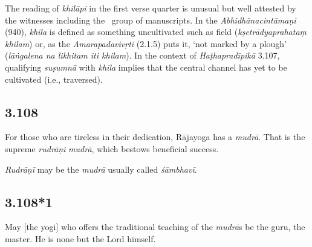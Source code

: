 \begin{ekdosis}
\begin{philcomm}[hp03_107]
The reading of \emph{khilāpi} in the first verse quarter is unusual but well attested by the witnesses including the \textalpha\ group of manuscripts. In the \emph{Abhidhāna\-cintāmaṇi} (940), \emph{khila} is defined as something uncultivated such as field (\emph{kṣetrādyaprahataṃ khilam}) or, as the \emph{Amarapadavivṛti} (2.1.5) puts it, `not marked by a plough' (\emph{lāṅgalena na likhitam iti khilam}). In the context of \emph{Haṭhapradīpikā} 3.107, qualifying \emph{suṣumnā} with \emph{khila} implies that the central channel has yet to be cultivated (i.e., traversed).



\end{philcomm}


\subsection*{3.108}
\begin{translation}[hp03_108]
For those who are tireless in their dedication, Rājayoga has a \emph{mudrā}. That is the supreme \emph{rudrāṇi} \emph{mudrā}, which bestows beneficial success.
\end{translation}



\begin{philcomm}[hp03_108]
\emph{Rudrāṇī} may be the \emph{mudrā} usually called \emph{śāmbhavī}.

\end{philcomm}


\subsection*{3.108*1}
\begin{translation}[hp03_108_1]
May [the yogi] who offers the traditional teaching of the \emph{mudrā}s be the guru, the master. He is none but the Lord himself.
\end{translation}


\end{ekdosis}
